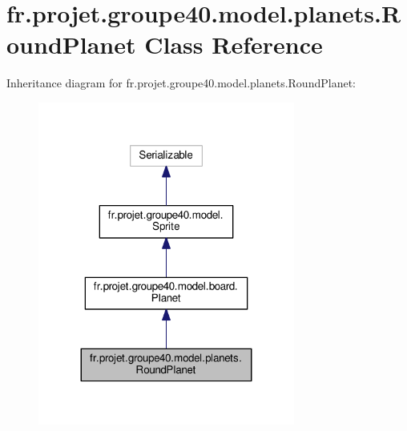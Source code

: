\hypertarget{classfr_1_1projet_1_1groupe40_1_1model_1_1planets_1_1_round_planet}{}\section{fr.\+projet.\+groupe40.\+model.\+planets.\+Round\+Planet Class Reference}
\label{classfr_1_1projet_1_1groupe40_1_1model_1_1planets_1_1_round_planet}


Inheritance diagram for fr.\+projet.\+groupe40.\+model.\+planets.\+Round\+Planet\+:\nopagebreak
\begin{figure}[H]
\begin{center}
\leavevmode
\includegraphics[width=239pt]{classfr_1_1projet_1_1groupe40_1_1model_1_1planets_1_1_round_planet__inherit__graph}
\end{center}
\end{figure}


